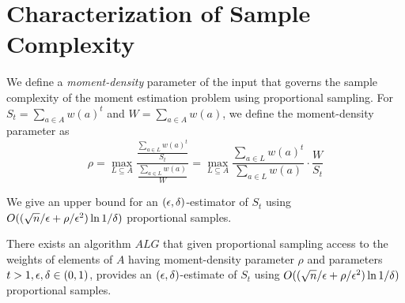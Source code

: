 \section{Characterization of Sample Complexity}\label{sec:characterize}

We define a {\it moment-density} parameter of the input that governs the sample complexity of the moment estimation problem using proportional sampling. For $S_t=\sum_{a\in A} w(a)^t$ and $W=\sum_{a\in A} w(a)$, we define the moment-density parameter as $$\rho=\max_{L\subseteq A} \frac{\frac{\sum_{a\in L} w(a)^t}{S_t}}{\frac{\sum_{a\in L}w(a)}{W}}=\max_{L\subseteq A} \frac{\sum_{a\in L} w(a)^t}{\sum_{a\in L} w(a)} \cdot \frac{W}{S_t}$$ 

We give an upper bound for an $(\epsilon,\delta)$-estimator of $S_t$ using $O(({\sqrt{n}}/{\epsilon}+\rho/\epsilon^2)\ln 1/\delta)$ proportional samples. 

\begin{thm}\label{thm:char-upper} There exists an algorithm $ALG$ that given proportional sampling access to the weights of elements of $A$ having moment-density parameter $\rho$ and parameters $t>1,\epsilon,\delta\in (0,1)$, provides an $(\epsilon,\delta)$-estimate of $S_t$ using $O(({\sqrt{n}}/{\epsilon}+\rho/\epsilon^2)\ln 1/\delta)$ proportional samples. \end{thm}

